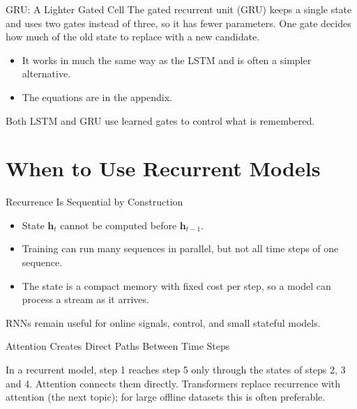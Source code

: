 \documentclass{ntuabeamer}
\begin{document}
\begin{frame}{GRU: A Lighter Gated Cell}
  The gated recurrent unit (GRU) keeps a single state and uses two gates instead of three, so it has fewer parameters.
  One gate decides how much of the old state to replace with a new candidate.
  \begin{itemize}
    \item It works in much the same way as the LSTM and is often a simpler alternative.
    \item The equations are in the appendix.
  \end{itemize}
  Both LSTM and GRU use learned gates to control what is remembered.
\end{frame}



\section{When to Use Recurrent Models}

\begin{frame}{Recurrence Is Sequential by Construction}
  \begin{itemize}
    \item State $\mathbf h_t$ cannot be computed before $\mathbf h_{t-1}$.
    \item Training can run many sequences in parallel, but not all time steps of one sequence.
    \item The state is a compact memory with fixed cost per step, so a model can process a stream as it arrives.
  \end{itemize}
  RNNs remain useful for online signals, control, and small stateful models.
\end{frame}

\begin{frame}{Attention Creates Direct Paths Between Time Steps}
  \centering

  \vspace{0.2cm}
  In a recurrent model, step 1 reaches step 5 only through the states of steps 2, 3 and 4. Attention connects them directly.
  Transformers replace recurrence with attention (the next topic); for large offline datasets this is often preferable.
\end{frame}
\end{document}
